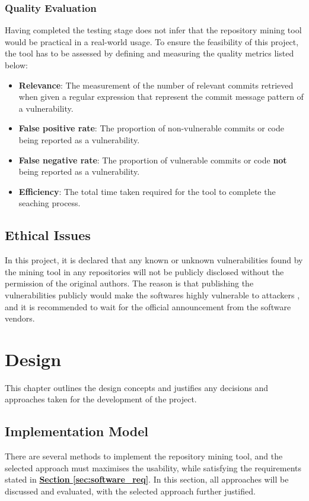 \documentclass[12pt, a4paper]{report}
\begin{document}
\subsection{Quality Evaluation}
Having completed the testing stage does not infer that the repository mining tool would be practical
in a real-world usage. To ensure the feasibility of this project, the tool has to be assessed by
defining and measuring the quality metrics listed below:

\begin{itemize}
  \item \textbf{Relevance}: The measurement of the number of relevant commits retrieved when given a
  regular expression that represent the commit message pattern of a vulnerability.
  \item \textbf{False positive rate}: The proportion of non-vulnerable commits or code being
  reported as a vulnerability.
  \item \textbf{False negative rate}: The proportion of vulnerable commits or code \textbf{not}
  being reported as a vulnerability.
  \item \textbf{Efficiency}: The total time taken required for the tool to complete the seaching
  process.
\end{itemize}

\section{Ethical Issues}
In this project, it is declared that any known or unknown vulnerabilities found by the mining tool
in any repositories will not be publicly disclosed without the permission of the original authors.
The reason is that publishing the vulnerabilities publicly would make the softwares highly
vulnerable to attackers \cite{arora_2010}, and it is recommended to wait for the official
announcement from the software vendors.

\chapter{Design}
This chapter outlines the design concepts and justifies any decisions and approaches taken for the
development of the project.

\section{Implementation Model}
There are several methods to implement the repository mining tool, and the selected approach must
maximises the usability, while satisfying the requirements stated in
\hyperref[sec:software_req]{\textbf{Section \ref*{sec:software_req}}}. In this section, all
approaches will be discussed and evaluated, with the selected approach further justified.
\end{document}

